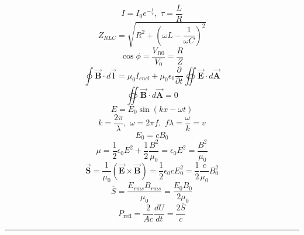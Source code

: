 \documentclass[12pt,landscape]{article}
\begin{document}
\begin{multicols}{4}
    \begin{equation*}
        I = I_0 e^{-\frac{t}{\tau}},\,\, \tau = \frac{L}{R}
    \end{equation*}
    \begin{equation*}
        Z_{RLC} = \sqrt{R^2 + \left(\omega L - \frac{1}{\omega C}\right)^2}
    \end{equation*}
    \begin{equation*}
        \cos \phi = \frac{V_{R0}}{V_0} = \frac{R}{Z}
    \end{equation*}
    \begin{equation*}
        \oint \vec{\mathbf{B}} \cdot d \vec{\boldsymbol{l}} = \mu_0 I_{encl} + \mu_0 \epsilon_0 \frac{\partial}{\partial t} \oiint \vec{\mathbf{E}} \cdot d\vec{\mathbf{A}}
    \end{equation*}
    \begin{equation*}
        \oiint \vec{\mathbf{B}} \cdot d \vec{\mathbf{A}} = 0
    \end{equation*}
    \begin{equation*}
        E = E_0 \sin (kx - \omega t)
    \end{equation*}
    \begin{equation*}
        k = \frac{2\pi}{\lambda}, \,\, \omega = 2\pi f,\,\, f \lambda = \frac{\omega}{k} = v
    \end{equation*}
    \begin{equation*}
        E_0 = c B_0
    \end{equation*}
    \begin{equation*}
        \mu = \frac{1}{2}\epsilon_0 E^2 + \frac{1}{2} \frac{B^2}{\mu_0} = \epsilon_0 E^2 = \frac{B^2}{\mu_0}
    \end{equation*}
    \begin{equation*}
        \vec{\mathbf{S}} = \frac{1}{\mu_0} (\vec{\mathbf{E}} \times \vec{\mathbf{B}}) = \frac{1}{2} \epsilon_0 c E_0^2 = \frac{1}{2} \frac{c}{\mu_0} B_0^2
    \end{equation*}
    \begin{equation*}
        \overbar{S} = \frac{E_{rms}B_{rms}}{\mu_0} = \frac{E_0 B_0}{2 \mu_0}
    \end{equation*}
    \begin{equation*}
        P_{\text{refl}} = \frac{2}{Ac} \frac{dU}{dt} = \frac{2 \overbar{S}}{c}
    \end{equation*}
    \rule{0.3\linewidth}{0.25pt}
    \scriptsize
    
    
\end{multicols}
\end{document}
